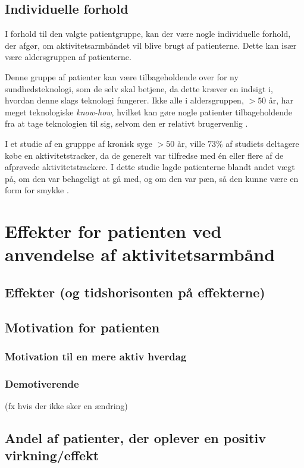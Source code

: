 \subsection{Individuelle forhold}
I forhold til den valgte patientgruppe, kan der være nogle individuelle forhold, der afgør, om aktivitetsarmbåndet vil blive brugt af patienterne. Dette kan især være aldersgruppen af patienterne. 

Denne gruppe af patienter kan være tilbageholdende over for ny sundhedsteknologi, som de selv skal betjene, da dette kræver en indsigt i, hvordan denne slags teknologi fungerer. Ikke alle i aldersgruppen, $>50$ år, har meget teknologiske \textit{know-how}, hvilket kan gøre nogle patienter tilbageholdende fra at tage teknologien til sig, selvom den er relativt brugervenlig \citep{mercer2016}. 

I et studie af en grupppe af kronisk syge $>50$ år, ville $73 \%$ af studiets deltagere købe en aktivitetstracker, da de generelt var tilfredse med én eller flere af de afprøvede aktivitetstrackere. I dette studie lagde patienterne blandt andet vægt på, om den var behageligt at gå med, og om den var pæn, så den kunne være en form for smykke \citep{mercer2016}.

\section{Effekter for patienten ved anvendelse af aktivitetsarmbånd}
\subsection{Effekter (og tidshorisonten på effekterne)}
\subsection{Motivation for patienten}
\subsubsection{Motivation til en mere aktiv hverdag}
\subsubsection{Demotiverende}
(fx hvis der ikke sker en ændring)
\subsection{Andel af patienter, der oplever en positiv virkning/effekt}

